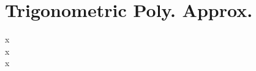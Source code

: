 \begin{comment}
## Error Theory
-> Lebesque Constant (infinite norm of error of lagrange interpolation, connects best error with error?)

Smoothness plays a large role to gauge errors

## Finding good interpolation 
-> Chebychev Nodes are a priori optimal
-> Write down the proof of why! (kind of nice) (difference in p_n-1 and n+1 zeros -> ==0)
-> Can be done efficiently by FFT with equidistant nodes?

### 

# What is to take home of "analytic interpolation", just an upper bound on interpolation error?
def analytic ~smooth
\end{comment}

\section{Trigonometric Poly. Approx.}
x \\
x \\
x \\

\begin{comment}
# Trigonometric Approximation (For periodic Signals)

## Error Estimate
-> smoothness leads to faster convergence
-> Every function has a Fourrier Series?

- L2-Norm of Fourrier Series given by sum of coefficients square
- Fourier modes higner than n can be distinguished when only sampling n points, hence they all get mapped to their modulo.
  -> The coeffiences are the sum of all higher multiples.
  
Now to continue on the search for an error estimate, need decay law for Fourrier:
 ->The smoother a periodic function the faster the decay of its Fourier coefficients decay in O(xxx) 6.5.2.20
 
 -> Main Result: algebraic convergenceof theL2-norm of the trigonometric interpolation error forfunctions withlimited smoothness
 
 ## Analytic Functions
 -> exponential convergence
 -> exponential decay of Fourrier coeffs.
 -> The larger the strip of analiticity the beter.
 
 Seems important, why fourrier coefficient equal integral over 0, 1? 4.2.6.20 -> its simply the projection of the function on that vector!
 Write entry in summary about fourrier Series!
\end{comment}


